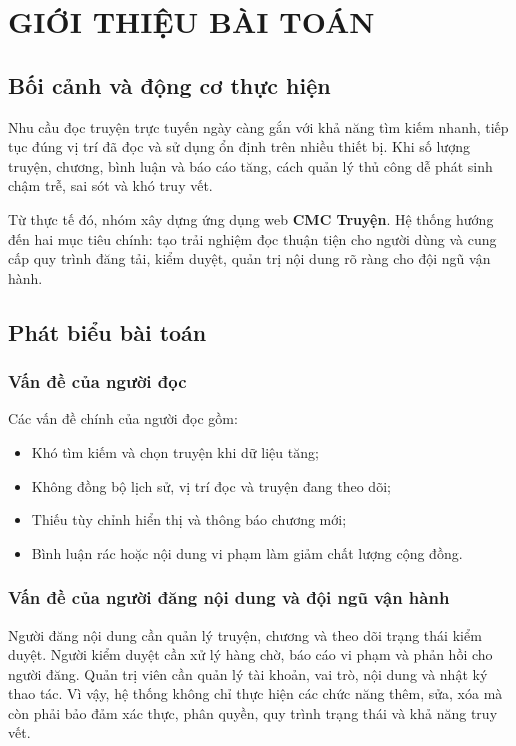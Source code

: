 
\chapter{GIỚI THIỆU BÀI TOÁN}
\label{chap:introduction}

\section{Bối cảnh và động cơ thực hiện}

Nhu cầu đọc truyện trực tuyến ngày càng gắn với khả năng tìm kiếm nhanh, tiếp tục đúng vị trí đã đọc và sử dụng ổn định trên nhiều thiết bị. Khi số lượng truyện, chương, bình luận và báo cáo tăng, cách quản lý thủ công dễ phát sinh chậm trễ, sai sót và khó truy vết.

Từ thực tế đó, nhóm xây dựng ứng dụng web \textbf{CMC Truyện}. Hệ thống hướng đến hai mục tiêu chính: tạo trải nghiệm đọc thuận tiện cho người dùng và cung cấp quy trình đăng tải, kiểm duyệt, quản trị nội dung rõ ràng cho đội ngũ vận hành.

\section{Phát biểu bài toán}

\subsection{Vấn đề của người đọc}
Các vấn đề chính của người đọc gồm:
\begin{itemize}[leftmargin=4.5em, label=--, labelsep=0.6em]

  \item Khó tìm kiếm và chọn truyện khi dữ liệu tăng;
  \item Không đồng bộ lịch sử, vị trí đọc và truyện đang theo dõi;
  \item Thiếu tùy chỉnh hiển thị và thông báo chương mới;
  \item Bình luận rác hoặc nội dung vi phạm làm giảm chất lượng cộng đồng.
\end{itemize}


\subsection{Vấn đề của người đăng nội dung và đội ngũ vận hành}

Người đăng nội dung cần quản lý truyện, chương và theo dõi trạng thái kiểm duyệt. Người kiểm duyệt cần xử lý hàng chờ, báo cáo vi phạm và phản hồi cho người đăng. Quản trị viên cần quản lý tài khoản, vai trò, nội dung và nhật ký thao tác. Vì vậy, hệ thống không chỉ thực hiện các chức năng thêm, sửa, xóa mà còn phải bảo đảm xác thực, phân quyền, quy trình trạng thái và khả năng truy vết.
\clearpage
